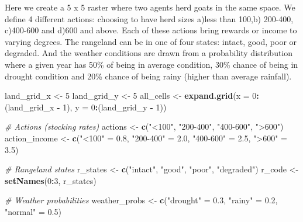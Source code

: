 \documentclass[
]{article}
\newenvironment{Shaded}{\begin{snugshade}}{\end{snugshade}}
\newcommand{\AttributeTok}[1]{\textcolor[rgb]{0.13,0.29,0.53}{#1}}
\newcommand{\CommentTok}[1]{\textcolor[rgb]{0.56,0.35,0.01}{\textit{#1}}}
\newcommand{\DecValTok}[1]{\textcolor[rgb]{0.00,0.00,0.81}{#1}}
\newcommand{\FloatTok}[1]{\textcolor[rgb]{0.00,0.00,0.81}{#1}}
\newcommand{\FunctionTok}[1]{\textcolor[rgb]{0.13,0.29,0.53}{\textbf{#1}}}
\newcommand{\NormalTok}[1]{#1}
\newcommand{\OtherTok}[1]{\textcolor[rgb]{0.56,0.35,0.01}{#1}}
\newcommand{\SpecialCharTok}[1]{\textcolor[rgb]{0.81,0.36,0.00}{\textbf{#1}}}
\newcommand{\StringTok}[1]{\textcolor[rgb]{0.31,0.60,0.02}{#1}}
\begin{document}
Here we create a 5 x 5 raster where two agents herd goats in the same
space. We define 4 different actions: choosing to have herd sizes a)less
than 100,b) 200-400, c)400-600 and d)600 and above. Each of these
actions bring rewards or income to varying degrees. The rangeland can be
in one of four states: intact, good, poor or degraded. And the weather
conditions are drawn from a probability distribution where a given year
has 50\% of being in average condition, 30\% chance of being in drought
condition and 20\% chance of being rainy (higher than average rainfall).

\begin{Shaded}
\begin{Highlighting}[]
\NormalTok{land\_grid\_x }\OtherTok{\textless{}{-}} \DecValTok{5}
\NormalTok{land\_grid\_y }\OtherTok{\textless{}{-}} \DecValTok{5}
\NormalTok{all\_cells }\OtherTok{\textless{}{-}} \FunctionTok{expand.grid}\NormalTok{(}\AttributeTok{x =} \DecValTok{0}\SpecialCharTok{:}\NormalTok{(land\_grid\_x }\SpecialCharTok{{-}} \DecValTok{1}\NormalTok{), }\AttributeTok{y =} \DecValTok{0}\SpecialCharTok{:}\NormalTok{(land\_grid\_y }\SpecialCharTok{{-}} \DecValTok{1}\NormalTok{))}

\CommentTok{\# Actions (stocking rates)}
\NormalTok{actions }\OtherTok{\textless{}{-}} \FunctionTok{c}\NormalTok{(}\StringTok{"\textless{}100"}\NormalTok{, }\StringTok{"200{-}400"}\NormalTok{, }\StringTok{"400{-}600"}\NormalTok{, }\StringTok{"\textgreater{}600"}\NormalTok{)}
\NormalTok{action\_income }\OtherTok{\textless{}{-}} \FunctionTok{c}\NormalTok{(}\StringTok{"\textless{}100"} \OtherTok{=} \FloatTok{0.8}\NormalTok{, }\StringTok{"200{-}400"} \OtherTok{=} \FloatTok{2.0}\NormalTok{, }\StringTok{"400{-}600"} \OtherTok{=} \FloatTok{2.5}\NormalTok{, }\StringTok{"\textgreater{}600"} \OtherTok{=} \FloatTok{3.5}\NormalTok{)}

\CommentTok{\# Rangeland states}
\NormalTok{r\_states }\OtherTok{\textless{}{-}} \FunctionTok{c}\NormalTok{(}\StringTok{"intact"}\NormalTok{, }\StringTok{"good"}\NormalTok{, }\StringTok{"poor"}\NormalTok{, }\StringTok{"degraded"}\NormalTok{)}
\NormalTok{r\_code }\OtherTok{\textless{}{-}} \FunctionTok{setNames}\NormalTok{(}\DecValTok{0}\SpecialCharTok{:}\DecValTok{3}\NormalTok{, r\_states)}

\CommentTok{\# Weather probabilities}
\NormalTok{weather\_probs }\OtherTok{\textless{}{-}} \FunctionTok{c}\NormalTok{(}\StringTok{"drought"} \OtherTok{=} \FloatTok{0.3}\NormalTok{, }\StringTok{"rainy"} \OtherTok{=} \FloatTok{0.2}\NormalTok{, }\StringTok{"normal"} \OtherTok{=} \FloatTok{0.5}\NormalTok{)}


\end{Highlighting}
\end{Shaded}
\end{document}
